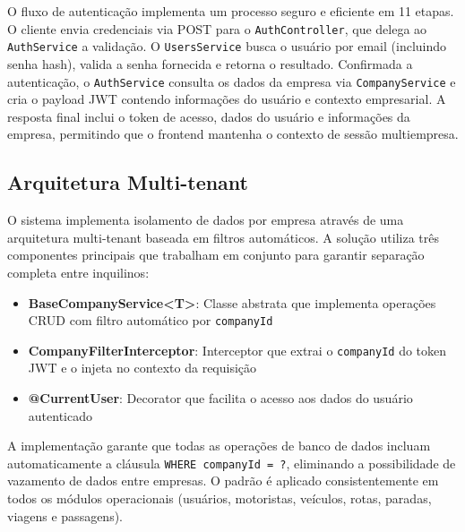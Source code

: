O fluxo de autenticação implementa um processo seguro e eficiente em 11 etapas. O cliente envia credenciais via POST para o \texttt{AuthController}, que delega ao \texttt{AuthService} a validação. O \texttt{UsersService} busca o usuário por email (incluindo senha hash), valida a senha fornecida e retorna o resultado. Confirmada a autenticação, o \texttt{AuthService} consulta os dados da empresa via \texttt{CompanyService} e cria o payload JWT contendo informações do usuário e contexto empresarial. A resposta final inclui o token de acesso, dados do usuário e informações da empresa, permitindo que o frontend mantenha o contexto de sessão multiempresa.

\subsection{Arquitetura Multi-tenant}

O sistema implementa isolamento de dados por empresa através de uma arquitetura multi-tenant baseada em filtros automáticos. A solução utiliza três componentes principais que trabalham em conjunto para garantir separação completa entre inquilinos:

\begin{itemize}
  \item \textbf{BaseCompanyService<T>}: Classe abstrata que implementa operações CRUD com filtro automático por \texttt{companyId}
  \item \textbf{CompanyFilterInterceptor}: Interceptor que extrai o \texttt{companyId} do token JWT e o injeta no contexto da requisição
  \item \textbf{@CurrentUser}: Decorator que facilita o acesso aos dados do usuário autenticado
\end{itemize}

A implementação garante que todas as operações de banco de dados incluam automaticamente a cláusula \texttt{WHERE companyId = ?}, eliminando a possibilidade de vazamento de dados entre empresas. O padrão é aplicado consistentemente em todos os módulos operacionais (usuários, motoristas, veículos, rotas, paradas, viagens e passagens).

